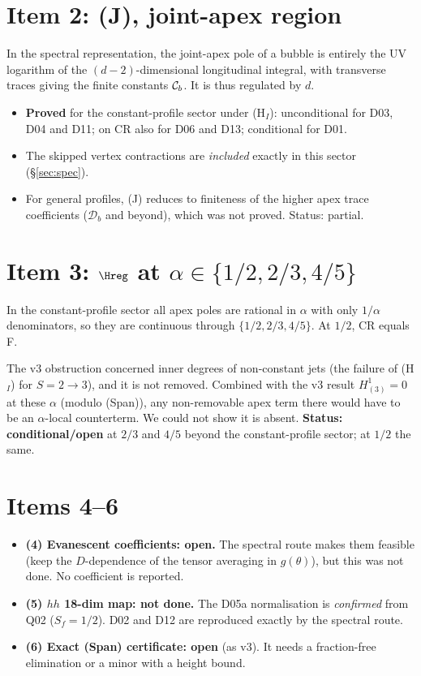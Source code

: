 \section{Item 2: (J), joint-apex region}
In the spectral representation, the joint-apex pole of a bubble is entirely the UV logarithm of the $(d-2)$-dimensional longitudinal integral, with transverse traces giving the finite constants $\mathcal C_b$. It is thus regulated by $d$.
\begin{itemize}
\item \textbf{Proved} for the constant-profile sector under (H$_I$): unconditional for D03, D04 and D11; on CR also for D06 and D13; conditional for D01.
\item The skipped vertex contractions are \emph{included} exactly in this sector (\S\ref{sec:spec}).
\item For general profiles, (J) reduces to finiteness of the higher apex trace coefficients ($\mathcal D_b$ and beyond), which was not proved. Status: partial.
\end{itemize}

\section{Item 3: $\Hreg$ at $\alpha\in\{1/2,2/3,4/5\}$}
In the constant-profile sector all apex poles are rational in $\alpha$ with only $1/\alpha$ denominators, so they are continuous through $\{1/2,2/3,4/5\}$. At $1/2$, CR equals F.

The v3 obstruction concerned inner degrees of non-constant jets (the failure of (H$_I$) for $S=2\to3$), and it is not removed. Combined with the v3 result $H^1_{(3)}=0$ at these $\alpha$ (modulo (Span)), any non-removable apex term there would have to be an $\alpha$-local counterterm. We could not show it is absent. \textbf{Status: conditional/open} at $2/3$ and $4/5$ beyond the constant-profile sector; at $1/2$ the same.

\section{Items 4--6}
\begin{itemize}
\item \textbf{(4) Evanescent coefficients: open.} The spectral route makes them feasible (keep the $D$-dependence of the tensor averaging in $g(\theta)$), but this was not done. No coefficient is reported.
\item \textbf{(5) $hh$ 18-dim map: not done.} The D05a normalisation is \emph{confirmed} from Q02 ($S_f=1/2$). D02 and D12 are reproduced exactly by the spectral route.
\item \textbf{(6) Exact (Span) certificate: open} (as v3). It needs a fraction-free elimination or a minor with a height bound.
\end{itemize}


